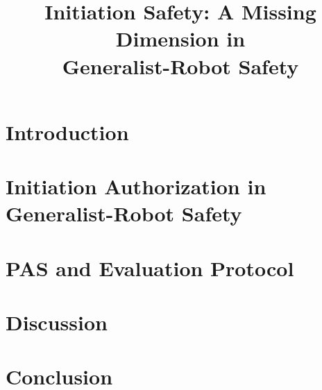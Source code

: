 \documentclass[conference]{IEEEtran}
\title{Initiation Safety: A Missing Dimension in\\
Generalist-Robot Safety}
\begin{document}
\maketitle

\begin{abstract}

\end{abstract}

\section{Introduction}
\label{sec:intro}


\section{Initiation Authorization in Generalist-Robot Safety}
\label{sec:taxonomy}


\section{PAS and Evaluation Protocol}
\label{sec:pas}


\section{Discussion}
\label{sec:discussion}


\section{Conclusion}
\label{sec:conclusion}




\end{document}
